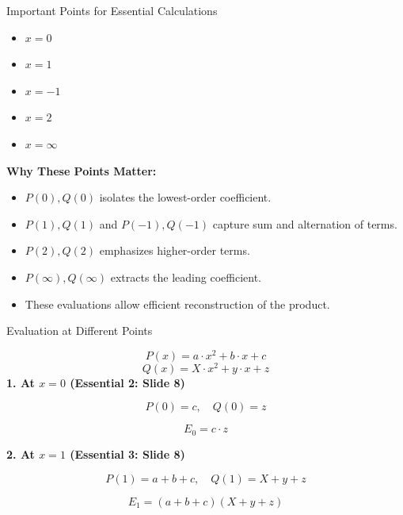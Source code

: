 \documentclass{beamer}
\begin{document}
\begin{frame}{Important Points for Essential Calculations}
    \begin{itemize}
        \item \( x = 0 \) \quad 
        \item \( x = 1 \) \quad 
        \item \( x = -1 \) \quad 
        \item \( x = 2 \) \quad 
        \item \( x = \infty \) \quad 
    \end{itemize}

    \vspace{0.5cm}
    \textbf{Why These Points Matter:}
    \begin{itemize}
        \item \( P(0), Q(0) \) isolates the lowest-order coefficient.
        \item \( P(1), Q(1) \) and \( P(-1), Q(-1) \) capture sum and alternation of terms.
        \item \( P(2), Q(2) \) emphasizes higher-order terms.
        \item \( P(\infty), Q(\infty) \) extracts the leading coefficient.
        \item These evaluations allow efficient reconstruction of the product.
    \end{itemize}
\end{frame}



\begin{frame}{Evaluation at Different Points}

\[
        P(x) = a \cdot x^2 + b \cdot x + c
        \]
        \[
        Q(x) = X \cdot x^2 + y \cdot x + z
        \]
    \textbf{1. At \( x=0 \) (Essential 2: Slide 8)}
    
    \[
    P(0) = c, \quad Q(0) = z
    \]

    \[
    E_0 = c \cdot z
    \]

    \textbf{2. At \( x=1 \) (Essential 3: Slide 8)}
    
    \[
    P(1) = a + b + c, \quad Q(1) = X + y + z
    \]

    \[
    E_1 = (a + b + c)(X + y + z)
    \]
\end{frame}
\end{document}
